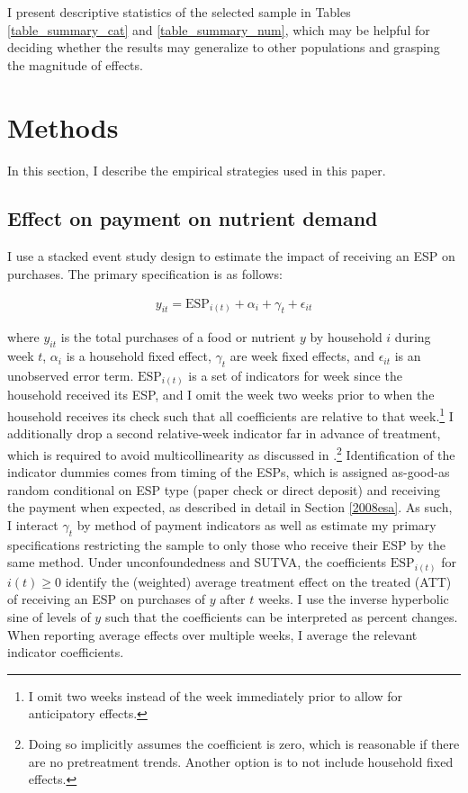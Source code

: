 \documentclass[12pt]{article}
\begin{document}
I present descriptive statistics of the selected sample in Tables \ref{table_summary_cat} and \ref{table_summary_num}, which may be helpful for deciding whether the results may generalize to other populations and grasping the magnitude of effects.


\section{Methods} \label{methods}

In this section, I describe the empirical strategies used in this paper.

\subsection{Effect on payment on nutrient demand}

I use a stacked event study design to estimate the impact of receiving an ESP on purchases.
The primary specification is as follows:

\begin{align}
	y_{it} = \text{ESP}_{i(t)} + \alpha_i + \gamma_t + \epsilon_{it} \label{spec_es}
\end{align}

where $y_{it}$ is the total purchases of a food or nutrient $y$ by household $i$ during week $t$, $\alpha_i$ is a household fixed effect, $\gamma_t$ are week fixed effects, and $\epsilon_{it}$ is an unobserved error term.
$\text{ESP}_{i(t)}$ is a set of indicators for week since the household received its ESP, and I omit the week two weeks prior to when the household receives its check such that all coefficients are relative to that week.\footnote{I omit two weeks instead of the week immediately prior to allow for anticipatory effects.} I additionally drop a second relative-week indicator far in advance of treatment, which is required to avoid multicollinearity as discussed in \textcite{borusyak2017revisiting}.\footnote{Doing so implicitly assumes the coefficient is zero, which is reasonable if there are no pretreatment trends.
Another option is to not include household fixed effects.} Identification of the indicator dummies comes from timing of the ESPs, which is assigned as-good-as random conditional on ESP type (paper check or direct deposit) and receiving the payment when expected, as described in detail in Section \ref{2008esa}.
As such, I interact $\gamma_t$ by method of payment indicators as well as estimate my primary specifications restricting the sample to only those who receive their ESP by the same method.
Under unconfoundedness and SUTVA, the coefficients $\text{ESP}_{i(t)}$ for $i(t) \geq 0$ identify the (weighted) average treatment effect on the treated (ATT) of receiving an ESP on purchases of $y$ after $t$ weeks.
I use the inverse hyperbolic sine of levels of $y$ such that the coefficients can be interpreted as percent changes.
When reporting average effects over multiple weeks, I average the relevant indicator coefficients.
\end{document}

